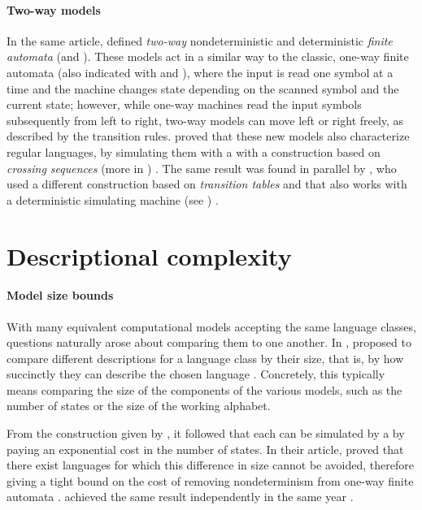 \paragraph{Two-way models} In the same article, \citeauthor{RabSco59} defined \emph{two-way} nondeterministic and deterministic \emph{finite automata} (\TNFA and \TDFA).
These models act in a similar way to the classic, one-way finite automata (also indicated with \ONFA and \ODFA), where the input is read one symbol at a time and the machine changes state depending on the scanned symbol and the current state; however, while one-way machines read the input symbols subsequently from left to right, two-way models can move left or right freely, as described by the transition rules.
\citeauthor{RabSco59} proved that these new models also characterize regular languages, by simulating them with a \ONFA with a construction based on \emph{crossing sequences} (more in ) \cite{RabSco59}.
The same result was found in parallel by \citeauthor{She59}, who used a different construction based on \emph{transition tables} and that also works with a deterministic simulating machine (see ) \cite{She59}.



\section{Descriptional complexity}

\paragraph{Model size bounds} With many equivalent computational models accepting the same language classes, questions naturally arose about comparing them to one another.
In \citeyear{MeyFis71}, \citeauthor{MeyFis71} proposed to compare different descriptions for a language class by their size, that is, by how succinctly they can describe the chosen language \cite{MeyFis71}.
Concretely, this typically means comparing the size of the components of the various models, such as the number of states or the size of the working alphabet.

From the construction given by \citeauthor{RabSco59}, it followed that each \NFA can be simulated by a \DFA by paying an exponential cost in the number of states.
In their article, \citeauthor{MeyFis71} proved that there exist languages for which this difference in size cannot be avoided, therefore giving a tight bound on the cost of removing nondeterminism from one-way finite automata \cite{MeyFis71}.
\citeauthor{Moo71} achieved the same result independently in the same year \cite{Moo71}.

